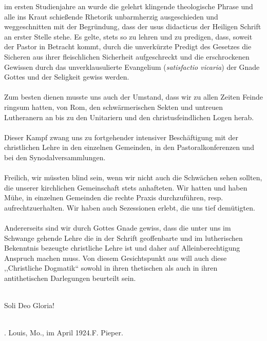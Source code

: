 im ersten Studienjahre an wurde die gelehrt klingende theologische Phrase und alle ins Kraut schießende Rhetorik unbarmherzig ausgeschieden und weggeschnitten mit der Begründung, dass der usus didacticus der Heiligen Schrift an erster Stelle stehe. Es gelte, stets so zu lehren und zu predigen, dass, soweit der Pastor in Betracht kommt, durch die unverkürzte Predigt des Gesetzes die Sicheren aus ihrer fleischlichen Sicherheit aufgeschreckt und die erschrockenen Gewissen durch das unverklausulierte Evangelium (\emph{satisfactio vicaria}) der Gnade Gottes und der Seligkeit gewiss werden.\\ \\Zum besten dienen musste uns auch der Umstand, dass wir zu allen Zeiten Feinde ringsum hatten, von Rom, den schwärmerischen Sekten und untreuen Lutheranern an bis zu den Unitariern und den christusfeindlichen Logen herab.\\ \\Dieser Kampf zwang uns zu fortgehender intensiver Beschäftigung mit der christlichen Lehre in den einzelnen Gemeinden, in den Pastoralkonferenzen und bei den Synodalversammlungen.\\ \\Freilich, wir müssten blind sein, wenn wir nicht auch die Schwächen sehen sollten, die unserer kirchlichen Gemeinschaft stets anhafteten. Wir hatten und haben Mühe, in einzelnen Gemeinden die rechte Praxis durchzuführen, resp. aufrechtzuerhalten. Wir haben auch Sezessionen erlebt, die uns tief demütigten.\\ \\Andererseits sind wir durch Gottes Gnade gewiss, dass die unter uns im Schwange gehende Lehre die in der Schrift geoffenbarte und im lutherischen Bekenntnis bezeugte christliche Lehre ist und daher auf Alleinberechtigung Anspruch machen muss. Von diesem Gesichtspunkt aus will auch diese ,,Christliche Dogmatik`` sowohl in ihren thetischen als auch in ihren antithetischen Darlegungen beurteilt sein.\\ \\\centerline{Soli Deo Gloria!}\\\St. Louis, Mo., im April 1924.\hfill F. Pieper.